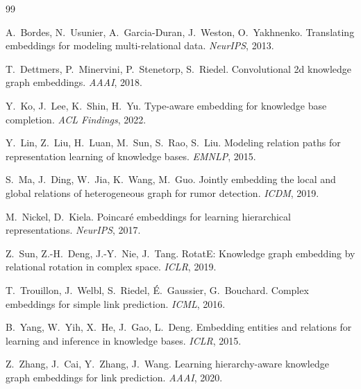\documentclass[10pt,twocolumn]{article}
\begin{document}

\begin{thebibliography}{99}

A.~Bordes, N.~Usunier, A.~Garcia-Duran, J.~Weston, O.~Yakhnenko.
\newblock Translating embeddings for modeling multi-relational data.
\newblock \emph{NeurIPS}, 2013.

T.~Dettmers, P.~Minervini, P.~Stenetorp, S.~Riedel.
\newblock Convolutional 2d knowledge graph embeddings.
\newblock \emph{AAAI}, 2018.

Y.~Ko, J.~Lee, K.~Shin, H.~Yu.
\newblock Type-aware embedding for knowledge base completion.
\newblock \emph{ACL Findings}, 2022.

Y.~Lin, Z.~Liu, H.~Luan, M.~Sun, S.~Rao, S.~Liu.
\newblock Modeling relation paths for representation learning of knowledge bases.
\newblock \emph{EMNLP}, 2015.

S.~Ma, J.~Ding, W.~Jia, K.~Wang, M.~Guo.
\newblock Jointly embedding the local and global relations of heterogeneous graph
for rumor detection.
\newblock \emph{ICDM}, 2019.

M.~Nickel, D.~Kiela.
\newblock Poincaré embeddings for learning hierarchical representations.
\newblock \emph{NeurIPS}, 2017.

Z.~Sun, Z.-H.~Deng, J.-Y.~Nie, J.~Tang.
\newblock RotatE: Knowledge graph embedding by relational rotation in complex space.
\newblock \emph{ICLR}, 2019.

T.~Trouillon, J.~Welbl, S.~Riedel, É.~Gaussier, G.~Bouchard.
\newblock Complex embeddings for simple link prediction.
\newblock \emph{ICML}, 2016.

B.~Yang, W.~Yih, X.~He, J.~Gao, L.~Deng.
\newblock Embedding entities and relations for learning and inference in knowledge bases.
\newblock \emph{ICLR}, 2015.

Z.~Zhang, J.~Cai, Y.~Zhang, J.~Wang.
\newblock Learning hierarchy-aware knowledge graph embeddings for link prediction.
\newblock \emph{AAAI}, 2020.

\end{thebibliography}
\end{document}
